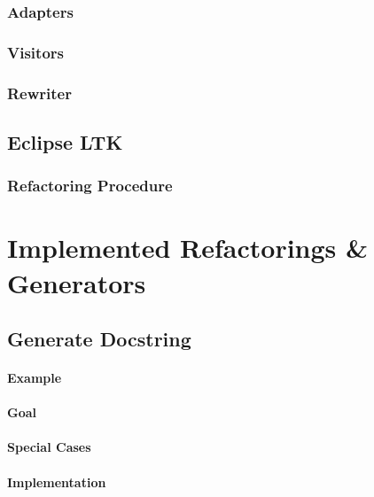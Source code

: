 \documentclass[12pt,halfparskip]{scrreprt}
\begin{document}
\subsection{Adapters}


\subsection{Visitors}


\subsection{Rewriter}


\section{Eclipse LTK}


\subsection{Refactoring Procedure}




\chapter{Implemented Refactorings \& Generators}


\section{Generate Docstring}


\subsubsection{Example}

\subsubsection{Goal}


\subsubsection{Special Cases}

\subsubsection{Implementation}
\end{document}
